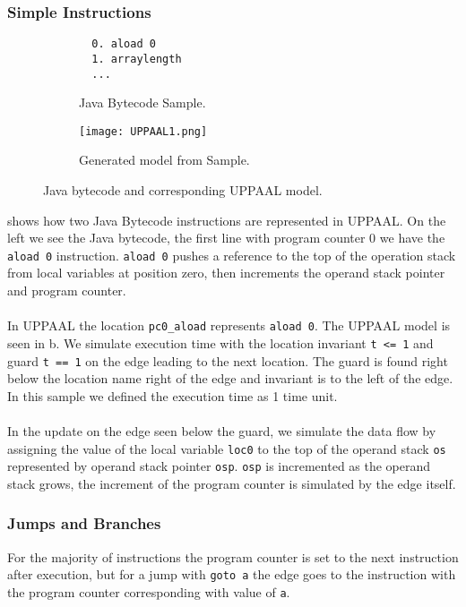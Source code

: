\subsubsection{Simple Instructions}
\begin{figure}[H]
\centering
\begin{subfigure}{.3\textwidth}
  \begin{lstlisting}
  0. aload 0
  1. arraylength
  ...
  \end{lstlisting}
  \caption{Java Bytecode Sample.}
\end{subfigure} 
\hspace{10px}
\begin{subfigure}{.6\textwidth}
  \texttt{[image: UPPAAL1.png]}
  \caption{Generated model from Sample.}
\end{subfigure}
\caption{Java bytecode and corresponding UPPAAL model.}
\label{fig:uppaal1}
\end{figure}
 shows how two Java Bytecode instructions are represented in UPPAAL. On the left we see the Java bytecode, the first line with program counter 0 we have the \texttt{aload 0} instruction. \texttt{aload 0} pushes a reference to the top of the operation stack from local variables at position zero, then increments the operand stack pointer and program counter.\\\\
In UPPAAL the location \texttt{pc0\_aload} represents \texttt{aload 0}. The UPPAAL model is seen in b. We simulate execution time with the location invariant \texttt{t <= 1}  and guard \texttt{t == 1} on the edge leading to the next location. The guard is found right below the location name right of the edge and invariant is to the left of the edge. In this sample we defined the execution time as 1 time unit.\\\\
In the update on the edge seen below the guard, we simulate the data flow by assigning the value of the local variable \texttt{loc0} to the top of the operand stack \texttt{os} represented by operand stack pointer \texttt{osp}. \texttt{osp} is incremented as the operand stack grows, the increment of the program counter is simulated by the edge itself.

\subsubsection{Jumps and Branches}
For the majority of instructions the program counter is set to the next instruction after execution, but for a jump with \texttt{goto a} the edge goes to the instruction with the program counter corresponding with value of \texttt{a}.

